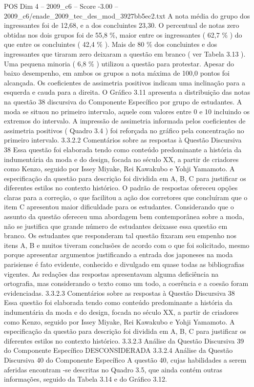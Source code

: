 \begin{textsample}{POS Dim 4 – 2009\_c6 – Score -3.00 – 2009\_c6/enade\_2009\_tec\_des\_mod\_3927bb5ec2.txt}
A nota média do grupo dos ingressantes foi de 12,68, e a dos concluintes 23,30.
O percentual de notas zero obtidas nos dois grupos foi de 55,8 \%, maior entre os ingressantes ( 62,7 \% ) do que entre os concluintes ( 42,4 \% ).
Mais de 80 \% dos concluintes e dos ingressantes que tiraram zero deixaram a questão em branco ( ver Tabela 3.13 ).
Uma pequena minoria ( 6,8 \% ) utilizou a questão para protestar.
Apesar do baixo desempenho, em ambos os grupos a nota máxima de 100,0 pontos foi alcançada.
Os coeficientes de assimetria positivos indicam uma inclinação para a esquerda e cauda para a direita.
O Gráfico 3.11 apresenta a distribuição das notas na questão 38 discursiva do Componente Específico por grupo de estudantes.
A moda se situou no primeiro intervalo, aquele com valores entre 0 e 10 incluindo os extremos do intervalo.
A impressão de assimetria informada pelos coeficientes de assimetria positivos ( Quadro 3.4 ) foi reforçada no gráfico pela concentração no primeiro intervalo. 3.3.2.2 Comentários sobre as respostas à Questão Discursiva 38 Essa questão foi elaborada tendo como conteúdo predominante a história da indumentária da moda e do design, focada no século XX, a partir de criadores como Kenzo, seguido por Issey Miyake, Rei Kawakubo e Yohji Yamamoto.
A especificação da questão para descrição foi dividida em A, B, C para justificar os diferentes estilos no contexto histórico.
O padrão de respostas ofereceu opções claras para a correção, o que facilitou a ação dos corretores que concluíram que o item C apresentou maior dificuldade para os estudantes.
Considerando que o assunto da questão ofereceu uma abordagem bem contemporânea sobre a moda, não se justifica que grande número de estudantes deixasse essa questão em branco.
Os estudantes que responderam tal questão fixaram seu empenho nos itens A, B e muitos tiveram conclusões de acordo com o que foi solicitado, mesmo porque apresentar argumentos justificando a entrada dos japoneses na moda parisiense é fato evidente, conhecido e divulgado em quase todas as bibliografias vigentes.
As redações das respostas apresentavam alguma deficiência na ortografia, mas considerando o texto como um todo, a coerência e a coesão foram evidenciadas. 3.3.2.3 Comentários sobre as respostas à Questão Discursiva 38 Essa questão foi elaborada tendo como conteúdo predominante a história da indumentária da moda e do design, focada no século XX, a partir de criadores como Kenzo, seguido por Issey Miyake, Rei Kawakubo e Yohji Yamamoto.
A especificação da questão para descrição foi dividida em A, B, C para justificar os diferentes estilos no contexto histórico. 3.3.2.3 Análise da Questão Discursiva 39 do Componente Específico DESCONSIDERADA 3.3.2.4 Análise da Questão Discursiva 40 do Componente Específico A questão 40, cujas habilidades a serem aferidas encontram -se descritas no Quadro 3.5, que ainda contém outras informações, seguido da Tabela 3.14 e do Gráfico 3.12.

\end{textsample}
